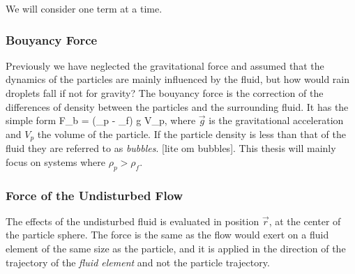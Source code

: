 We will consider one term at a time. 

\subsubsection{Bouyancy Force}

Previously we have neglected the gravitational force and assumed that the dynamics of the particles are mainly influenced by the fluid, but how would rain droplets fall if not for gravity? The bouyancy force is the correction of the differences of density between the particles and the surrounding fluid. It has the simple form
\beq
\vec F_b = (\rho_p - \rho_f) \vec g V_p,
\eeq
where $\vec g$ is the gravitational acceleration and $V_p$ the volume of the particle. If the particle density is less than that of the fluid they are referred to as \emph{bubbles}. [lite om bubbles]. This thesis will mainly focus on systems where $\rho_p > \rho_f$.




\subsubsection{Force of the Undisturbed Flow}

The effects of the undisturbed fluid is evaluated in position $\vec r$, at the center of the particle sphere. The force is the same as the flow would exert on a fluid element of the same size as the particle, and it is applied in the direction of the trajectory of the \emph{fluid element} and not the particle trajectory. 

